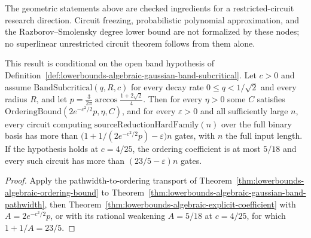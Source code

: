 The geometric statements above are checked ingredients for a restricted-circuit
research direction. Circuit freezing, probabilistic polynomial approximation,
and the Razborov--Smolensky degree lower bound are not formalized by these nodes;
no superlinear unrestricted circuit theorem follows from them alone.

\begin{theorem}
  \label{thm:lowerbounds-algebraic-explicit-band}
  \leanok
  This result is conditional on the open band hypothesis of
  Definition~\ref{def:lowerbounds-algebraic-gaussian-band-subcritical}. Let $c>0$ and assume
  $\mathrm{BandSubcritical}(q,R,c)$ for every decay rate $0\le q<1/\sqrt2$ and every radius
  $R$, and let $p=\tfrac{3}{2\pi}\arccos\tfrac{1+2\sqrt2}{4}$. Then for every $\eta>0$ some $C$
  satisfies $\mathrm{OrderingBound}(2e^{-c^2/2}p,\eta,C)$, and for every $\varepsilon>0$ and
  all sufficiently large $n$, every circuit computing $\mathrm{sourceReductionHardFamily}(n)$
  over the full binary basis has more than $\bigl(1+1/(2e^{-c^2/2}p)-\varepsilon\bigr)n$ gates,
  with $n$ the full input length. If the hypothesis holds at $c=4/25$, the ordering
  coefficient is at most $5/18$ and every such circuit has more than $(23/5-\varepsilon)n$
  gates.
\end{theorem}
\begin{proof}
  \leanok
  Apply the pathwidth-to-ordering transport of
  Theorem~\ref{thm:lowerbounds-algebraic-ordering-bound} to
  Theorem~\ref{thm:lowerbounds-algebraic-gaussian-band-pathwidth}, then
  Theorem~\ref{thm:lowerbounds-algebraic-explicit-coefficient} with $A=2e^{-c^2/2}p$, or with
  its rational weakening $A=5/18$ at $c=4/25$, for which $1+1/A=23/5$.
\end{proof}

